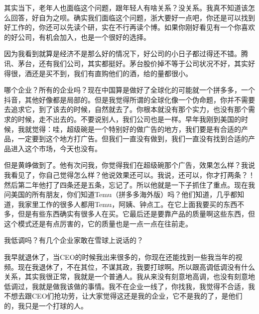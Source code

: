 

其实当下，老年人也面临这个问题，跟年轻人有啥关系？没关系。我真不知道该怎么回答，好自为之呗。确实我们面临这个问题，浙大要好一点吧，你还是可以找到好工作的，你还可以先读个研，实在不行再读个博。如果你刚好看见有一个你喜欢的好公司，有机会加入，也是一个很好的选择。

因为我看到就算是经济不是那么好的情况下，好公司的小日子都过得还不错。腾讯、茅台，还有我们公司，其实都挺好。茅台股价掉不等于公司状况不好，其实好得很，酒还是买不到，我们有直购他们的酒，给的量都很小。



哪个企业？所有的企业吗？现在中国算是做好了全球化的可能就一个拼多多，一个抖音，其他好像都是局部的。但是我觉得所谓的全球化像一个伪命题，你并不需要去追求它，到了该去的时候，自然就去了。你根本就没有那个实力，也没有那个需求的时候，走不出去的。不要说别人，我们公司也是一样。早年我刚到美国的时候，我就觉得：哇，超级碗是一个特别好的做广告的地方，我们要是有合适的产品，一定要到这个地方打广告。但我们一直没有做到，我们一直没有找到合适的产品进入这个市场，今天也没有。

但是黄峥做到了。他有次问我，你觉得我们在超级碗那个广告，效果怎么样？我说我看见了，你自己觉得怎么样？他说效果还可以。我说，还可以，你才打两条？！然后第二年他打了四条还是五条，忘记了。所以他就是一下子抓住了重点。现在我问美国的所有朋友，你们知道Temu（拼多多海外版）吗？他们知道，几乎都知道，我家里工作的很多人都用Temu，阿姨、钟点工。在它上面我要买的东西不多，但是有些东西确实有很多人在买。它最后还是要靠产品的质量啊这些东西，但这个模式还是有点厉害的，它的质量也是一点一点在往前走。



我低调吗？有几个企业家敢在雪球上说话的？

我早就退休了，当CEO的时候我出来很多的，你现在还能找到一些我当年的视频。现在我退休了，不在其位，不谋其政，我要打球啊。所以跟高调低调没有什么关系，其实我很正常，我就是一个普通人。我从来没有刻意地高调，也没有刻意地低调过，我就是做我该做的事情。我不在企业一线了，你找我，我觉得不合适，我不想去跟CEO们抢功劳，让大家觉得这还是我的企业，它不是我的了，是他们的，我只是一个打球的人。


